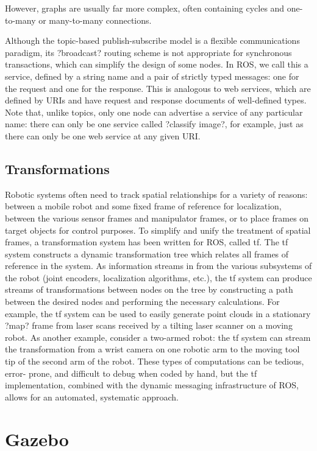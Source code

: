 However, graphs are usually far more complex, often containing cycles and one-to-many or many-to-many connections.

Although the topic-based publish-subscribe model is a flexible communications paradigm, its ?broadcast? routing scheme is not appropriate for synchronous transactions, which can simplify the design of some nodes. In ROS, we call this a service, defined by a string name and a pair of strictly typed messages: one for the request and one for the response. This is analogous to web services, which are defined by URIs and have request and response documents of well-defined types. Note that, unlike topics, only one node can advertise a service of any particular name: there can only be one service called ?classify image?, for example, just as there can only be one web service at any given URI.


\subsection{Transformations}

Robotic systems often need to track spatial relationships for a variety of reasons: between a mobile robot and some fixed frame of reference for localization, between the various sensor frames and manipulator frames, or to place frames on target objects for control purposes.
To simplify and unify the treatment of spatial frames, a transformation system has been written for ROS, called tf. The tf system constructs a dynamic transformation tree which relates all frames of reference in the system. As information streams in from the various subsystems of the robot (joint encoders, localization algorithms, etc.), the tf system can produce streams of transformations between nodes on the tree by constructing a path between the desired nodes and performing the necessary calculations.
For example, the tf system can be used to easily generate point clouds in a stationary ?map? frame from laser scans received by a tilting laser scanner on a moving robot. As another example, consider a two-armed robot: the tf system can stream the transformation from a wrist camera on one robotic arm to the moving tool tip of the second arm of the robot. These types of computations can be tedious, error- prone, and difficult to debug when coded by hand, but the tf implementation, combined with the dynamic messaging infrastructure of ROS, allows for an automated, systematic approach.

\section{Gazebo}

